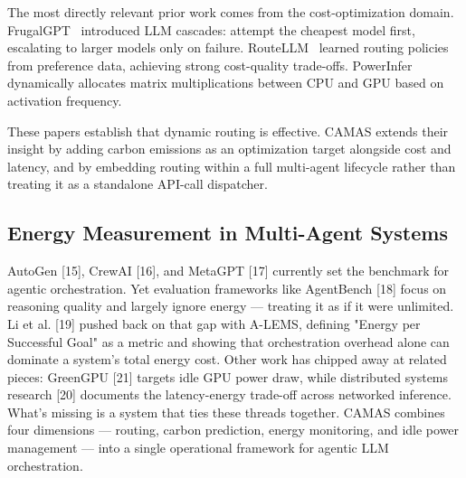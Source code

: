 \documentclass[journal]{IEEEtran}
\begin{document}
The most directly relevant prior work comes from the cost-optimization domain.
FrugalGPT~\cite{chen2023frugalgpt} introduced LLM cascades: attempt the
cheapest model first, escalating to larger models only on failure.
RouteLLM~\cite{shao2024routellm} learned routing policies from preference data,
achieving strong cost-quality trade-offs. PowerInfer~\cite{song2024powerinfer}
dynamically allocates matrix multiplications between CPU and GPU based on
activation frequency.

These papers establish that dynamic routing is effective. CAMAS extends their
insight by adding carbon emissions as an optimization target alongside cost and
latency, and by embedding routing within a full multi-agent lifecycle rather
than treating it as a standalone API-call dispatcher.

\subsection{Energy Measurement in Multi-Agent Systems}

AutoGen [15], CrewAI [16], and MetaGPT [17] currently set the benchmark for agentic orchestration. Yet evaluation frameworks like AgentBench [18] focus on reasoning quality and largely ignore energy — treating it as if it were unlimited. Li et al. [19] pushed back on that gap with A-LEMS, defining "Energy per Successful Goal" as a metric and showing that orchestration overhead alone can dominate a system's total energy cost. Other work has chipped away at related pieces: GreenGPU [21] targets idle GPU power draw, while distributed systems research [20] documents the latency-energy trade-off across networked inference.
What's missing is a system that ties these threads together. CAMAS combines four dimensions — routing, carbon prediction, energy monitoring, and idle power management — into a single operational framework for agentic LLM orchestration.
\end{document}
